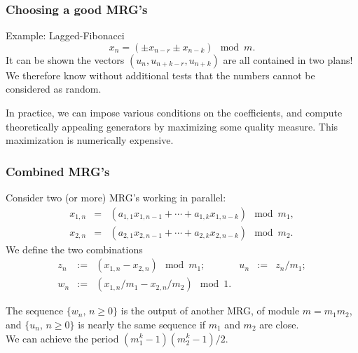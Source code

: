 \documentclass{beamer}
\begin{document}
	\begin{frame}
		\frametitle{Choosing a good MRG's}
		
		{\blue Example: Lagged-Fibonacci}
		\[
		x_n = (\pm x_{n-r} \pm x_{n-k}) \mod m.
		\]
		It can be shown the vectors $(u_n, u_{n+k-r}, u_{n+k})$ are all
		contained in two plans! We therefore know without additional tests
		that the numbers cannot be considered as random.
		
		\mbox{}
		
		In practice, we can impose various conditions on the coefficients, and
		compute theoretically appealing generators by maximizing some quality
		measure. This maximization is numerically expensive.
		
	\end{frame}
	
	\begin{frame}
		\frametitle{Combined MRG's}
		
		Consider two (or more) MRG's working in parallel:
		\begin{eqnarray*}
			x_{1,n} &=& (a_{1,1} x_{1,n-1} + \cdots + a_{1,k} x_{1,n-k}) \mod m_1,\\
			x_{2,n} &=& (a_{2,1} x_{2,n-1} + \cdots + a_{2,k} x_{2,n-k}) \mod m_2.
		\end{eqnarray*}
		We define the two {\red combinations}
		$$
		\begin {array}{rclrcl}
		z_n &:=& (x_{1,n} - x_{2,n}) \mod m_1; &
		{u_n} &:=& z_n/m_1; \\
		{w_n} &:=& (x_{1,n}/m_1 - x_{2,n}/m_2) \mod 1.
		\end {array}
		$$
		
		\mbox{}
		
		The sequence ${\{w_n,\, n\ge 0\}}$ is the output of another MRG, of
		module ${m} = m_1 m_2$, and ${\{u_n,\, n\ge 0\}}$ is nearly the same
		sequence if $m_1$ and $m_2$ are close.\\
		We can achieve the period $(m_1^k-1)(m_2^k-1)/2$.
		
	\end{frame}
	
\end{document}
